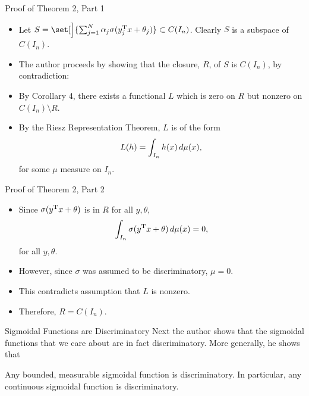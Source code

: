 \documentclass[11pt,letterpaper]{beamer}
\begin{document}
\begin{frame}{Proof of Theorem 2, Part 1}
  \begin{itemize}
  \item Let $S=\set[\Big]{\sum_{j=1}^N
      \alpha_j\sigma( y_j^\rmT x+\theta_j)}\subset C(I_n)$. Clearly $S$
    is a subspace of $C(I_n)$.
  \item The author proceeds by showing that the closure, $R$, of $S$ is
    $C(I_n)$, by contradiction:
  \item By Corollary 4, there exists a functional $L$ which is zero on $R$ but
    nonzero on $C(I_n)\setminus R$.
  \item By the Riesz Representation Theorem, $L$ is of the form
    \[
      L(h)=\int_{I_n}h(x)\mathop{}\!d\mu(x),
    \]
    for some $\mu$ measure on $I_n$.
  \end{itemize}
\end{frame}

\begin{frame}{Proof of Theorem 2, Part 2}
  \begin{itemize}
  \item Since $\sigma( y^{\mathrm{T}} x+\theta)$ is in $R$ for all $ y,\theta$,
    \[
      \int_{I_n}\sigma( y^{\mathrm{T}} x+\theta)\mathop{}\!d\mu( x)=0,
    \]
    for all $ y,\theta$.
  \item However, since $\sigma$ was assumed to be discriminatory, $\mu=0$.
  \item This contradicts assumption that $L$ is nonzero.
  \item Therefore, $R=C(I_n)$.
  \end{itemize}
\end{frame}

\begin{frame}{Sigmoidal Functions are Discriminatory}
  Next the author shows that the sigmoidal functions that we care about are in
  fact discriminatory. More generally, he shows that
  \setcounter{theorem}{2}
  \begin{lemma}
    Any bounded, measurable sigmoidal function is discriminatory. In particular,
    any continuous sigmoidal function is discriminatory.
  \end{lemma}
  \setcounter{theorem}{7}
\end{frame}
\end{document}
